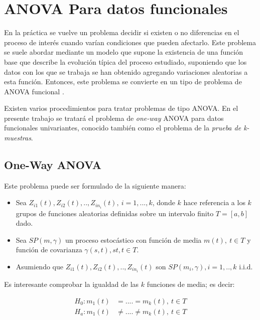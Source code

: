 \documentclass[
]{book}
\begin{document}
\hypertarget{anova-para-datos-funcionales}{%
\section{ANOVA Para datos funcionales}\label{anova-para-datos-funcionales}}

En la práctica se vuelve un problema decidir si existen o no diferencias en el proceso de interés cuando varían condiciones que pueden afectarlo. Este problema se suele abordar mediante un modelo que supone la existencia de una función base que describe la evolución típica del proceso estudiado, suponiendo que los datos con los que se trabaja se han obtenido agregando variaciones aleatorias a esta función. Entonces, este problema se convierte en un tipo de problema de ANOVA funcional \citep{cuesta}.

Existen varios procedimientos para tratar problemas de tipo ANOVA. En el presente trabajo se tratará el problema de \emph{one-way} ANOVA para datos funcionales univariantes, conocido también como el problema de la \emph{prueba de k-muestras}.

\hypertarget{one-way-anova}{%
\subsection{One-Way ANOVA}\label{one-way-anova}}

Este problema puede ser formulado de la siguiente manera:

\begin{itemize}
\item
  Sea \(Z_{i1}(t), Z_{i2}(t),..,Z_{in_i}(t),\ i=1,...,k\), donde \(k\) hace referencia a los \(k\) grupos de funciones aleatorias definidas sobre un intervalo finito \(T=[a,b]\) dado.
\item
  Sea \(SP(m,\gamma)\) un proceso estocástico con función de media \(m(t),\ t\in T\) y función de covarianza \(\gamma(s,t), st,t\in T\).
\item
  Asumiendo que \(Z_{i1}(t), Z_{i2}(t),..,Z_{in_i}(t)\) son \(SP(m_i,\gamma),i=1,..,k\) i.i.d.
\end{itemize}

Es interesante comprobar la igualdad de las \(k\) funciones de media; es decir:

\begin{align*}
    H_0:m_1(t)&=....=m_k(t),\ t\in T\\
    H_a:m_1(t)&\neq....\neq m_k(t),\ t\in T
\end{align*}
\end{document}

